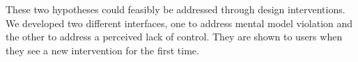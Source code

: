 These two hypotheses could feasibly be addressed through design interventions.   We developed two different interfaces, one to address mental model violation and the other to address a perceived lack of control. They are shown to users when they see a new intervention for the first time.

